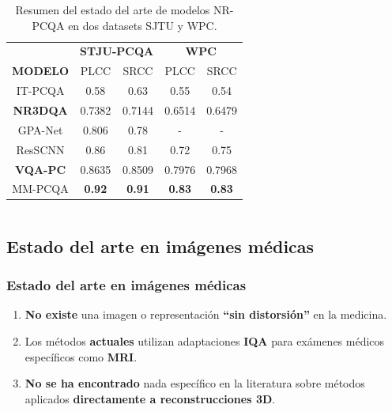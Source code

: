 \begin{frame}
\begin{columns}
      \begin{table}[htp]
          \footnotesize
          \centering
          \begin{tabular}{|c|c|c|c|c|}
              \hline
              \rowcolor[HTML]{FFC702}
              \cellcolor[HTML]{FFC702} & \multicolumn{2}{c|}{\cellcolor[HTML]{FFC702}\textbf{STJU-PCQA}} & \multicolumn{2}{c|}{\cellcolor[HTML]{FFC702}\textbf{WPC}} \\ 
              \cline{2-5}
             \multirow{-2}{*}{\cellcolor[HTML]{FFC702}\textbf{MODELO}}  &\multicolumn{1}{c|}{\cellcolor[HTML]{FFC702} PLCC} & \multicolumn{1}{c|}{\cellcolor[HTML]{FFC702}SRCC} & \multicolumn{1}{c|}{\cellcolor[HTML]{FFC702}PLCC} & \multicolumn{1}{c|}{\cellcolor[HTML]{FFC702}SRCC} \\
              \hline
              IT-PCQA & 0.58 & 0.63 & 0.55  & 0.54\\
              \hline
              \textbf<1->{NR3DQA} & 0.7382 & 0.7144 & 0.6514 & 0.6479\\
              \hline
              GPA-Net & 0.806 & 0.78 & - & - \\
              \hline
              ResSCNN & 0.86 & 0.81 & 0.72 & 0.75\\
              \hline
              \textbf<2->{VQA-PC} & 0.8635 & 0.8509 & 0.7976 & 0.7968\\
              \hline
              MM-PCQA & \textbf{0.92} & \textbf{0.91} & \textbf{0.83} & \textbf{0.83}\\
              \hline
          \end{tabular}
          \caption[Estado del arte de modelos NR-PCQA]{
          Resumen del estado del arte de modelos NR-PCQA en dos datasets SJTU y WPC.
        }
      \end{table}
  \end{columns}
\end{frame}

\subsection{Estado del arte en imágenes médicas}
\begin{frame}
  \frametitle{Estado del arte en imágenes médicas}
  \begin{enumerate}
    \item \textbf{No existe} una imagen o representación \textbf{``sin distorsión''} en la medicina.
    \item Los métodos \textbf{actuales} utilizan adaptaciones \textbf{IQA} para 
      exámenes médicos específicos como \textbf{MRI}.
    \item \textbf{No se ha encontrado} nada específico en la literatura sobre 
      métodos aplicados \textbf{directamente a reconstrucciones 3D}.
  \end{enumerate}
\end{frame}
